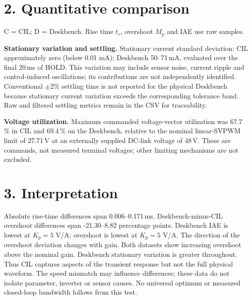 \documentclass[a4paper,11pt]{article}
\begin{document}
\newpage
\section*{2. Quantitative comparison}
C = CIL; D = Deskbench. Rise time $t_r$, overshoot $M_p$ and IAE use raw samples.
\begin{center}
\setlength{\tabcolsep}{4pt}

\end{center}
\textbf{Stationary variation and settling.}
Stationary current standard deviation: CIL approximately zero (below 0.01 mA); Deskbench 50--71\,mA, evaluated over the final 20\,ms of HOLD. This variation may include sensor noise, current ripple and control-induced oscillations; its contributions are not independently identified. Conventional $\pm2\%$ settling time is not reported for the physical Deskbench because stationary current variation exceeds the corresponding tolerance band. Raw and filtered settling metrics remain in the CSV for traceability.

\par\textbf{Voltage utilization.}
Maximum commanded voltage-vector utilization was 67.7\,\% in CIL and 69.4\,\% on the Deskbench, relative to the nominal linear-SVPWM limit of 27.71\,V at an externally supplied DC-link voltage of 48\,V. These are commands, not measured terminal voltages; other limiting mechanisms are not excluded.


\section*{3. Interpretation}
Absolute rise-time differences span 0.006--0.171\,ms. Deskbench-minus-CIL overshoot differences span -21.30--8.82 percentage points. Deskbench IAE is lowest at $K_p=5$ V/A; overshoot is lowest at $K_p=5$ V/A. The direction of the overshoot deviation changes with gain. Both datasets show increasing overshoot above the nominal gain. Deskbench stationary variation is greater throughout. Thus CIL captures aspects of the transient response but not the full physical waveform. The speed mismatch may influence differences; these data do not isolate parameter, inverter or sensor causes. No universal optimum or measured closed-loop bandwidth follows from this test.
\end{document}
